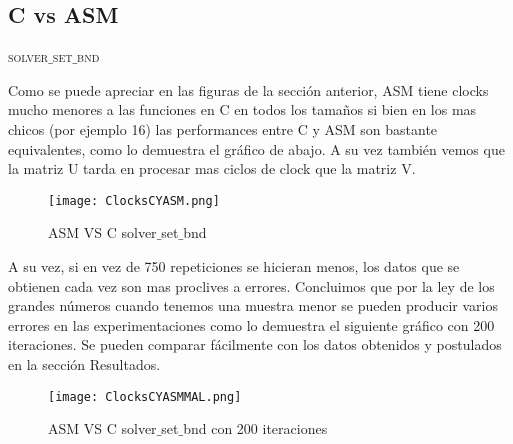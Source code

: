 \graphicspath{{./img/}}

\subsection{C vs ASM}

{\scshape\Large solver$\_$set$\_$bnd\par}

Como se puede apreciar en las figuras de la sección anterior, ASM tiene clocks mucho menores a las funciones en C en todos los tamaños si bien en los mas chicos (por ejemplo 16) las performances entre C y ASM son bastante equivalentes, como lo demuestra el gráfico de abajo. A su vez también vemos que la matriz U tarda en procesar mas ciclos de clock que la matriz V.

\begin{figure}[h]
  \centering
  	\texttt{[image: ClocksCYASM.png]}
  	\caption{ASM VS C solver$\_$set$\_$bnd}
  	\label{fig:ASMU}
\end{figure}

A su vez, si en vez de 750 repeticiones se hicieran menos, los datos que se obtienen cada vez son mas proclives a errores. Concluimos que por la ley de los grandes números cuando tenemos una muestra menor se pueden producir varios errores en las experimentaciones como lo demuestra el siguiente gráfico con 200 iteraciones. Se pueden comparar fácilmente con los datos obtenidos y postulados en la sección Resultados.

\begin{figure}[h]
  \centering
  	\texttt{[image: ClocksCYASMMAL.png]}
  	\caption{ASM VS C solver$\_$set$\_$bnd con 200 iteraciones}
  	\label{fig:ASMU}
\end{figure}
